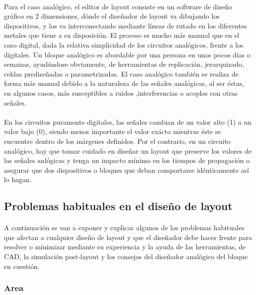 \paragraph{}
Para el caso analógico, el editor de layout consiste en un software
de diseño gráfico en 2 dimensiones, dónde el diseñador de layout va dibujando los
dispositivos, y los va interconectando mediante líneas de rutado en los diferentes
metales que tiene a su disposición. El proceso es mucho más manual que en el caso
digital, dada la relativa simplicidad de los circuitos analógicos, frente a los
digitales. Un bloque analógico es abordable por una persona en unos pocos días o
semanas, ayudándose obviamente, de herramientas de replicación, jerarquizado, celdas
prediseñadas o parametrizadas. El caso analógico también se realiza de forma más
manual debido a la naturaleza de las señales analógicas, al ser éstas, en algunos casos,
más susceptibles a ruidos ,interferencias o acoplos con otras señales.

\paragraph{}
En los circuitos puramente digitales, las señales cambian de un
valor alto (1) a un valor bajo (0), siendo menos importante el valor exácto
mientras éste se encuentre dentro de los márgenes definidos. Por el contrario,
en un circuito analógico, hay que tomar cuidado en diseñar un layout que preserve
los valores de las señales anlógicas y tenga un impacto mínimo en los tiempos de
propagación o asegurar que dos dispositivos o bloques que deban comportarse idénticamente
así lo hagan.

\subsection{Problemas habituales en el diseño de layout}

\paragraph{}
A continuación se van a exponer y explicar algunos de los problemas habituales que
afectan a cualquier diseño de layout y que el diseñador debe hacer frente para
resolver o minimizar mediante su experiencia y la ayuda de las herramientas, de CAD,
la simulación post-layout y los consejos del diseñador analógico del bloque en cuestión.

\subsubsection{Area}

